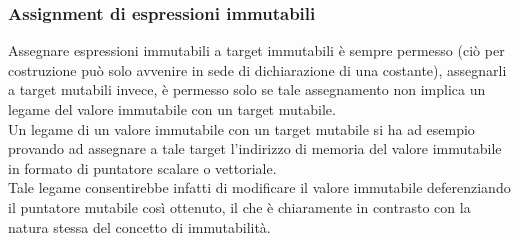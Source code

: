 \subsubsection{Assignment di espressioni immutabili}
Assegnare espressioni immutabili a target immutabili è sempre permesso 
(ciò per costruzione può solo avvenire in sede di dichiarazione di una costante), 
assegnarli a target mutabili invece, è permesso solo se tale assegnamento non implica un legame
del valore immutabile con un target mutabile. \\

Un legame di un valore immutabile con un target mutabile si ha ad esempio provando ad assegnare
a tale target l'indirizzo di memoria del valore immutabile in formato di puntatore scalare 
o vettoriale. \\

Tale legame consentirebbe infatti di modificare il valore immutabile deferenziando il puntatore 
mutabile così ottenuto, il che è chiaramente in contrasto con la natura stessa del concetto di 
immutabilità. \\